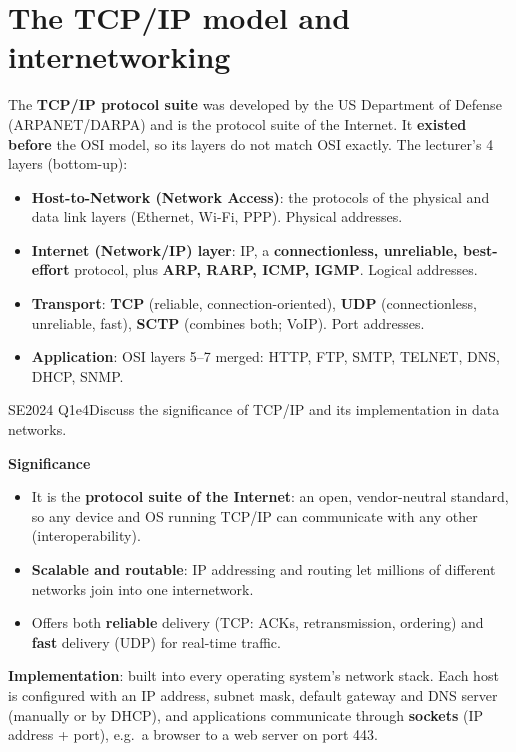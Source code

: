 \documentclass[10pt]{article}
\begin{document}
\section{The TCP/IP model and internetworking}

The \textbf{TCP/IP protocol suite} was developed by the US Department of Defense (ARPANET/DARPA) and is the protocol suite of the Internet.
It \textbf{existed before} the OSI model, so its layers do not match OSI exactly. The lecturer's 4 layers (bottom-up):

\begin{itemize}
\item \textbf{Host-to-Network (Network Access)}: the protocols of the physical and data link layers (Ethernet, Wi-Fi, PPP). Physical addresses.
\item \textbf{Internet (Network/IP) layer}: IP, a \textbf{connectionless, unreliable, best-effort} protocol, plus \textbf{ARP, RARP, ICMP, IGMP}. Logical addresses.
\item \textbf{Transport}: \textbf{TCP} (reliable, connection-oriented), \textbf{UDP} (connectionless, unreliable, fast), \textbf{SCTP} (combines both; VoIP). Port addresses.
\item \textbf{Application}: OSI layers 5--7 merged: HTTP, FTP, SMTP, TELNET, DNS, DHCP, SNMP.
\end{itemize}

\begin{pastq}{SE2024 Q1e}{4}Discuss the significance of TCP/IP and its implementation in data networks.\end{pastq}
\begin{ans}
\textbf{Significance}
\begin{itemize}
\item It is the \textbf{protocol suite of the Internet}: an open, vendor-neutral standard, so any device and OS running TCP/IP can communicate with any other (interoperability).
\item \textbf{Scalable and routable}: IP addressing and routing let millions of different networks join into one internetwork.
\item Offers both \textbf{reliable} delivery (TCP: ACKs, retransmission, ordering) and \textbf{fast} delivery (UDP) for real-time traffic.
\end{itemize}
\textbf{Implementation}: built into every operating system's network stack. Each host is configured with an IP address, subnet mask, default gateway and DNS server (manually or by DHCP), and applications communicate through \textbf{sockets} (IP address + port), e.g.\ a browser to a web server on port 443.
\end{ans}
\end{document}
